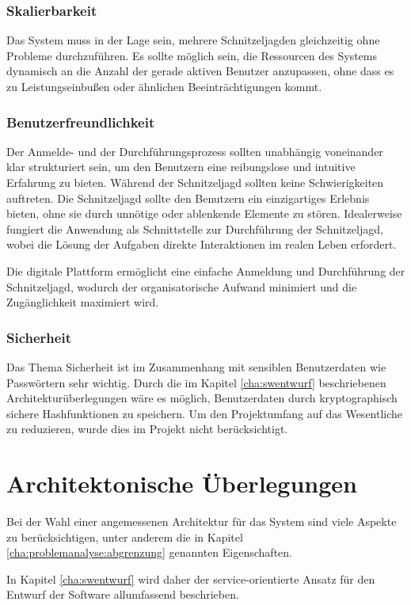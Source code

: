 \subsubsection{Skalierbarkeit}

Das System muss in der Lage sein, mehrere Schnitzeljagden gleichzeitig ohne Probleme durchzuführen. Es sollte möglich sein, die Ressourcen des Systems dynamisch an die Anzahl der gerade aktiven Benutzer anzupassen, ohne dass es zu Leistungseinbußen oder ähnlichen Beeinträchtigungen kommt.

\subsubsection{Benutzerfreundlichkeit}

Der Anmelde- und der Durchführungsprozess sollten unabhängig voneinander klar strukturiert sein, um den Benutzern eine reibungslose und intuitive Erfahrung zu bieten. Während der Schnitzeljagd sollten keine Schwierigkeiten auftreten. Die Schnitzeljagd sollte den Benutzern ein einzigartiges Erlebnis bieten, ohne sie durch unnötige oder ablenkende Elemente zu stören. Idealerweise fungiert die Anwendung als Schnittstelle zur Durchführung der Schnitzeljagd, wobei die Lösung der Aufgaben direkte Interaktionen im realen Leben erfordert.

Die digitale Plattform ermöglicht eine einfache Anmeldung und Durchführung der Schnitzeljagd, wodurch der organisatorische Aufwand minimiert und die Zugänglichkeit maximiert wird.

\subsubsection{Sicherheit}

Das Thema Sicherheit ist im Zusammenhang mit sensiblen Benutzerdaten wie Passwörtern sehr wichtig. Durch die im Kapitel \ref{cha:swentwurf} beschriebenen Architekturüberlegungen wäre es möglich, Benutzerdaten durch kryptographisch sichere Hashfunktionen zu speichern. Um den Projektumfang auf das Wesentliche zu reduzieren, wurde dies im Projekt nicht berücksichtigt.

\section{Architektonische Überlegungen}

Bei der Wahl einer angemessenen Architektur für das System sind viele Aspekte zu berücksichtigen, unter anderem die in Kapitel \ref{cha:problemanalyse:abgrenzung} genannten Eigenschaften.

In Kapitel \ref{cha:swentwurf} wird daher der service-orientierte Ansatz für den Entwurf der Software allumfassend beschrieben.
